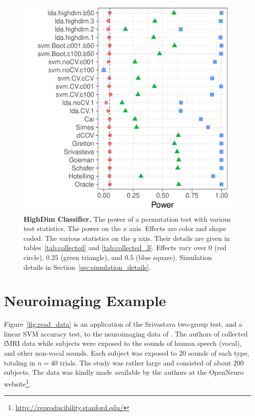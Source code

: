 \documentclass[onecolumn,draftclsnofoot]{IEEEtran}
\begin{document}
\begin{figure}[ht]
	\centering
	\includegraphics[width=0.7\columnwidth]{"art/file14"}
	\caption{
		\textbf{HighDim Classifier.} 
		The power of a permutation test with various test statistics. 
		The power on the $x$ axis. 
		Effects are color and shape coded. 
		The various statistics on the $y$ axis. 
		Their details are given in tables~\ref{tab:collected} and \ref{tab:collected_3}. 
		Effects vary over $0$ (red circle), $0.25$ (green triangle), and $0.5$ (blue square). 
		Simulation details in Section~\ref{sec:simulation_details}.
	} 
	\label{fig:highdim}
\end{figure}








\section{Neuroimaging Example}
\label{sec:example}

Figure~\ref{fig:read_data} is an application of the Srivastava two-group test, and a linear SVM accuracy test, to the neuroimaging data of \cite{pernet_human_2015}. 
The authors of \cite{pernet_human_2015} collected fMRI data while subjects were exposed to the sounds of human speech (vocal), and other non-vocal sounds. 
Each subject was exposed to $20$ sounds of each type, totaling in $n=40$ trials.
The study was rather large and consisted of about $200$ subjects.
The data was kindly made available by the authors at the OpenNeuro website\footnote{\url{http://reproducibility.stanford.edu/}}.
\end{document}
